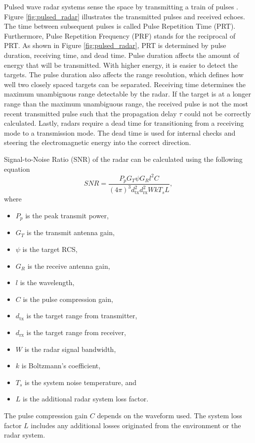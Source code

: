 \documentclass[english, 12pt, a4paper, elec, utf8, a-1b, online]{aaltothesis}
\begin{document}
Pulsed wave radar systems sense the space by transmitting a train of pulses \cite{Mahafza2015}.
Figure \ref{fig:pulsed_radar} illustrates the transmitted pulses and received echoes.
The time between subsequent pulses is called Pulse Repetition Time (PRT). 
Furthermore, Pulse Repetition Frequency (PRF) stands for the reciprocal of PRT.
As shown in Figure \ref{fig:pulsed_radar}, PRT is determined by pulse duration, receiving time, and dead time.
Pulse duration affects the amount of energy that will be transmitted.
With higher energy, it is easier to detect the targets.
The pulse duration also affects the range resolution, which defines how well two closely spaced targets can be separated.
Receiving time determines the maximum unambiguous range detectable by the radar.
If the target is at a longer range than the maximum unambiguous range, the received pulse is not the most recent transmitted pulse such that the propagation delay $\tau$ could not be correctly calculated.
Lastly, radars require a dead time for transitioning from a receiving mode to a transmission mode.
The dead time is used for internal checks and steering the electromagnetic energy into the correct direction.

Signal-to-Noise Ratio (SNR) of the radar can be calculated using the following equation \cite{Curry2011}
\begin{equation} \label{eq:radar_snr}
SNR = \frac{P_p G_T \psi G_R l^2 C}{(4\pi)^3 d_\text{tx}^2 d_\text{rx}^2 W k T_s L},
\end{equation}
where
\begin{itemize}
    \item $P_p$ is the peak transmit power,
    \item $G_T$ is the transmit antenna gain,
    \item $\psi$ is the target RCS,
    \item $G_R$ is the receive antenna gain,
    \item $l$ is the wavelength,
    \item $C$ is the pulse compression gain,
    \item $d_\text{tx}$ is the target range from transmitter,
    \item $d_\text{rx}$ is the target range from receiver,
    \item $W$ is the radar signal bandwidth,
    \item $k$ is Boltzmann's coefficient,
    \item $T_s$ is the system noise temperature, and 
    \item $L$ is the additional radar system loss factor.
\end{itemize}
The pulse compression gain $C$ depends on the waveform used.
The system loss factor $L$ includes any additional losses originated from the environment or the radar system.
\end{document}
